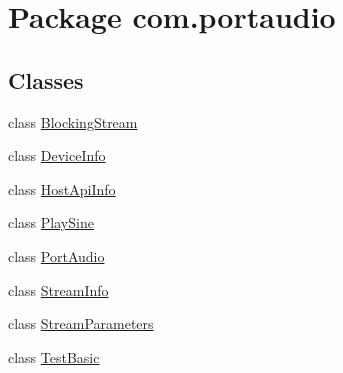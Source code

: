 \hypertarget{namespacecom_1_1portaudio}{}\section{Package com.\+portaudio}
\label{namespacecom_1_1portaudio}
\subsection*{Classes}
\begin{DoxyCompactItemize}
\item 
class \hyperlink{classcom_1_1portaudio_1_1_blocking_stream}{Blocking\+Stream}
\item 
class \hyperlink{classcom_1_1portaudio_1_1_device_info}{Device\+Info}
\item 
class \hyperlink{classcom_1_1portaudio_1_1_host_api_info}{Host\+Api\+Info}
\item 
class \hyperlink{classcom_1_1portaudio_1_1_play_sine}{Play\+Sine}
\item 
class \hyperlink{classcom_1_1portaudio_1_1_port_audio}{Port\+Audio}
\item 
class \hyperlink{classcom_1_1portaudio_1_1_stream_info}{Stream\+Info}
\item 
class \hyperlink{classcom_1_1portaudio_1_1_stream_parameters}{Stream\+Parameters}
\item 
class \hyperlink{classcom_1_1portaudio_1_1_test_basic}{Test\+Basic}
\end{DoxyCompactItemize}
